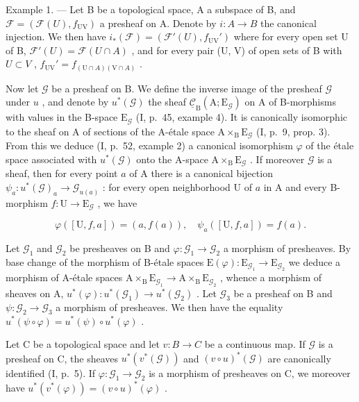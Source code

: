 Example 1. --- Let B be a topological space, A a subspace of B, and \(\mathcal{F} = (\mathcal{F}(U), f_{\mathrm{UV}})\) a presheaf on A. Denote by \(i: A \to B\) the canonical injection. We then have \(i_*(\mathcal{F}) = (\mathcal{F}'(U), f_{\mathrm{UV}}')\) where for every open set U of B, \(\mathcal{F}'(U) = \mathcal{F}(U \cap A)\) , and for every pair (U, V) of open sets of B with \(U \subset V\) , \(f_{\mathrm{UV}}' = f_{(\mathrm{U} \cap A)(\mathrm{V} \cap A)}\) .

Now let \(\mathcal{G}\) be a presheaf on B. We define the inverse image of the presheaf \(\mathcal{G}\) under \(u\) , and denote by \(u^{*}(\mathcal{G})\) the sheaf \(\underline{\mathcal{C}}_{\mathrm{B}}(\mathrm{A};\mathrm{E}_{\mathcal{G}})\) on A of B-morphisms with values in the B-space \(\mathrm{E}_{\mathcal{G}}\) (I, p.~45, example 4). It is canonically isomorphic to the sheaf on A of sections of the A-étale space \(\mathrm{A} \times_{\mathrm{B}} \mathrm{E}_{\mathcal{G}}\) (I, p.~9, prop. 3). From this we deduce (I, p.~52, example 2) a canonical isomorphism \(\varphi\) of the étale space associated with \(u^{*}(\mathcal{G})\) onto the A-space \(\mathrm{A} \times_{\mathrm{B}} \mathrm{E}_{\mathcal{G}}\) . If moreover \(\mathcal{G}\) is a sheaf, then for every point \(a\) of A there is a canonical bijection \(\psi_{a}: u^{*}(\mathcal{G})_{a} \to \mathcal{G}_{u(a)}\) : for every open neighborhood U of \(a\) in A and every B-morphism \(f: \mathrm{U} \to \mathrm{E}_{\mathcal{G}}\) , we have

\[
\varphi ([ \mathrm{U}, f, a ]) = (a, f (a)), \quad \psi_ {a} ([ \mathrm{U}, f, a ]) = f (a).
\]

Let \(\mathcal{G}_1\) and \(\mathcal{G}_2\) be presheaves on B and \(\varphi\colon\mathcal{G}_1\to\mathcal{G}_2\) a morphism of presheaves. By base change of the morphism of B-étale spaces \(\mathrm{E}(\varphi)\colon\mathrm{E}_{\mathcal{G}_1}\to\mathrm{E}_{\mathcal{G}_2}\) we deduce a morphism of A-étale spaces \(\mathrm{A}\times_{\mathrm{B}}\mathrm{E}_{\mathcal{G}_1}\to\mathrm{A}\times_{\mathrm{B}}\mathrm{E}_{\mathcal{G}_2}\) , whence a morphism of sheaves on A, \(u^{*}(\varphi)\colon u^{*}(\mathcal{G}_{1})\to u^{*}(\mathcal{G}_{2})\) . Let \(\mathcal{G}_3\) be a presheaf on B and \(\psi\colon\mathcal{G}_2\to\mathcal{G}_3\) a morphism of presheaves. We then have the equality \(u^{*}(\psi\circ\varphi)=u^{*}(\psi)\circ u^{*}(\varphi)\) .

Let C be a topological space and let \(v\colon B \to C\) be a continuous map. If \(\mathcal{G}\) is a presheaf on C, the sheaves \(u^{*}(v^{*}(\mathcal{G}))\) and \((v \circ u)^{*}(\mathcal{G})\) are canonically identified (I, p.~5). If \(\varphi\colon\mathcal{G}_{1} \to \mathcal{G}_{2}\) is a morphism of presheaves on C, we moreover have \(u^{*}(v^{*}(\varphi)) = (v \circ u)^{*}(\varphi)\) .

